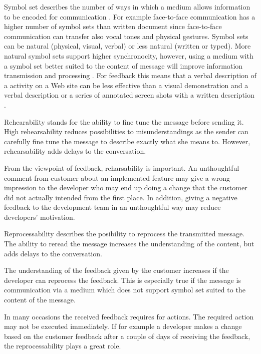 \documentclass[conference]{IEEEtran}
\begin{document}
Symbol set describes the number of ways in which a medium allows information to be encoded for communication \cite{2008dennis}. For example face-to-face communication has a higher number of symbol sets than written document since face-to-face communication can transfer also vocal tones and physical gestures. Symbol sets can be natural (physical, visual, verbal) or less natural (written or typed). More natural symbol sets support higher synchronocity, however, using a medium with a symbol set better suited to the content of message will improve information transmission and processing \cite{2008dennis}. For feedback this means that a verbal description of a activity on a Web site can be less effective than a visual demonstration and a verbal description or a series of annotated screen shots with a written description \cite{2008dennis}.

Rehearability stands for the ability to fine tune the message before sending it. High rehearsability reduces possibilities to misunderstandings as the sender can carefully fine tune the message to describe exactly what she means to. However, rehearsability adds delays to the conversation. \cite{2008dennis} 

From the viewpoint of feedback, reharsability is important. An unthoughtful comment from customer about an implemented feature may give a wrong impression to the developer who may end up doing a change that the customer did not actually intended from the first place. In addition, giving a negative feedback to the development team in an unthoughtful way may reduce developers' motivation.

Reprocessability describes the posibility to reprocess the transmitted message. The ability to reread the message increases the understanding of the content, but adds delays to the conversation. \cite{2008dennis}

The understanding of the feedback given by the customer increases if the developer can reprocess the feedback. This is especially true if the message is communication via a medium which does not support symbol set suited to the content of the message. 

In many occasions the received feedback requires for actions. The required action may not be executed immediately. If for example a developer makes a change based on the customer feedback after a couple of days of receiving the feedback, the reprocessability plays a great role.

\end{document}
